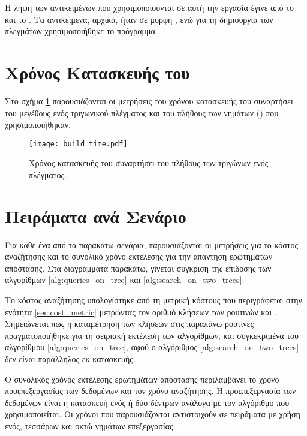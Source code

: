 Η λήψη των αντικειμένων που χρησιμοποιούνται σε αυτή την εργασία 
έγινε από το \cite{GrabCAD} και το 
\cite{3dcontentcentral}. 
Τα αντικείμενα, αρχικά, ήταν σε μορφή , ενώ για τη 
δημιουργία των πλεγμάτων χρησιμοποιήθηκε το πρόγραμμα 
.


\section{Χρόνος Κατασκευής του }
Στο σχήμα \ref{fig:build_time} παρουσιάζονται οι μετρήσεις του 
χρόνου κατασκευής του  συναρτήσει του μεγέθους ενός 
τριγωνικού πλέγματος και του πλήθους των νημάτων ()
που χρησιμοποιήθηκαν.

\begin{figure}[h]
    \centering
    \texttt{[image: build\_time.pdf]}
    \caption[Χρόνοι Κατασκευής του ]{
        Χρόνος κατασκευής του  συναρτήσει 
        του πλήθους των τριγώνων ενός πλέγματος.
    }
    \label{fig:build_time}
\end{figure}

\section{Πειράματα ανά Σενάριο}
Για κάθε ένα από τα παρακάτω σενάρια, παρουσιάζονται οι 
μετρήσεις για το κόστος αναζήτησης και το συνολικό χρόνο 
εκτέλεσης για την απάντηση ερωτημάτων απόστασης.
Στα διαγράμματα παρακάτω, γίνεται σύγκριση της επίδοσης των αλγορίθμων 
\ref{alg:queries_on_tree} και \ref{alg:search_on_two_trees}.

Το κόστος αναζήτησης υπολογίστηκε από τη μετρική κόστους 
που περιγράφεται στην ενότητα \ref{sec:cost_metric} 
μετρώντας τον αριθμό κλήσεων των ρουτινών 
 και .
Σημειώνεται πως η καταμέτρηση των κλήσεων στις παραπάνω ρουτίνες 
πραγματοποιήθηκε για τη σειριακή εκτέλεση των αλγορίθμων, και συγκεκριμένα 
του αλγορίθμου \ref{alg:queries_on_tree}, αφού ο αλγόριθμος 
\ref{alg:search_on_two_trees} δεν είναι παράλληλος εκ κατασκευής.

Ο συνολικός χρόνος εκτέλεσης ερωτημάτων απόστασης περιλαμβάνει 
το χρόνο προεπεξεργασίας των δεδομένων και τον χρόνο αναζήτησης.
Η προεπεξεργασία των δεδομένων είναι η κατασκευή ενός ή δύο δέντρων 
ανάλογα με τον αλγόριθμο που χρησιμοποιείται.
Οι χρόνοι που παρουσιάζονται αντιστοιχούν σε πειράματα με χρήση 
ενός, τεσσάρων και οκτώ νημάτων επεξεργασίας.

